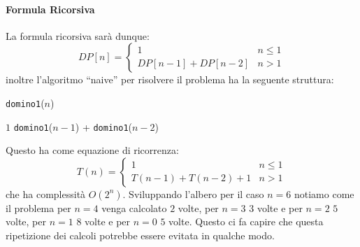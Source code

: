             \paragraph{Formula Ricorsiva} La formula ricorsiva sarà dunque:
            \begin{equation*}
                DP[n] = \begin{cases}
                    1 & n \leq 1 \\
                    DP[n-1] + DP[n-2] & n > 1
                \end{cases}
            \end{equation*}
            inoltre l'algoritmo ``naive'' per risolvere il problema ha la seguente struttura:
            \begin{algorithm}[H]
                \caption{\Int \texttt{domino1}(\Int $n$)}
                \begin{algorithmic}
                        \State \Return $1$
                    \EndIf
                    \State \Return \texttt{domino1}($n-1$) + \texttt{domino1}($n-2$)
                \end{algorithmic}
            \end{algorithm}
            Questo ha come equazione di ricorrenza:
            $$
                T(n)=\begin{cases}
                    1 & n \leq 1 \\
                    T(n-1) + T(n-2) + 1 & n > 1
                \end{cases}
            $$
            che ha complessità $O(2^n)$.\newline
            Sviluppando l'albero per il caso $n=6$ notiamo come il problema per $n=4$ venga calcolato $2$ volte, per $n=3$ $3$ volte e per $n=2$ $5$ volte, per $n=1$ $8$ volte e per $n=0$ $5$ volte. Questo ci fa capire che questa ripetizione dei calcoli potrebbe essere evitata in qualche modo.
